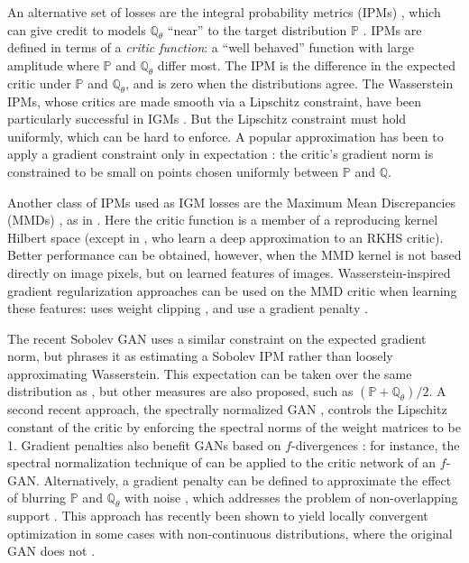 \documentclass{article}
\newcommand{\PP}{\mathbb P}
\newcommand{\QQ}{\mathbb Q}
\let\citep\parencite
\begin{document}
An alternative set of losses are the integral probability metrics (IPMs) \citep{Mueller97},
which can give credit to models $\QQ_{\theta}$  ``near'' to the target
distribution $\PP$ \parencites{wgan}{Bottou:2017}[Section 4 of][]{GneRaf07}.
IPMs are defined in terms of a {\em critic function}: a
``well behaved'' function with  large amplitude
where $\PP$ and $\QQ_\theta$ differ most.
The IPM is  the difference in the expected critic under $\PP$ and $\QQ_\theta$,
and is zero when the distributions agree.
The Wasserstein IPMs, whose critics are made smooth via a Lipschitz constraint,
have been particularly successful in IGMs \citep{wgan,wgan-gp,sinkhorn-igm}.
But the Lipschitz constraint must hold uniformly, which can be hard
to enforce. A popular approximation has been to apply a gradient constraint
only in expectation \citep{wgan-gp}:
the critic's gradient norm is constrained to be small
on points chosen uniformly between $\PP$ and $\QQ$.

Another class of IPMs used as IGM losses
are the Maximum Mean Discrepancies (MMDs) \citep{mmd-jmlr}, as in \citep{gmmn,gen-mmd}. Here the critic
function is a member of a reproducing kernel Hilbert space
(except in \cite{coulomb-gan}, who learn a deep approximation to an RKHS critic).
Better performance can be obtained, however, when the MMD kernel is not based
directly on image pixels, but on learned features
of images. Wasserstein-inspired gradient regularization
approaches can be used on the MMD critic when learning these features:
\citep{mmd-gan} uses weight clipping \citep{wgan}, and \citep{Binkowski:2018,cramer-gan}
use a gradient penalty \citep{wgan-gp}.

The recent Sobolev GAN \citep{sobolev-gan}
uses a similar constraint on the expected gradient norm,
but phrases it as estimating a Sobolev IPM rather than loosely approximating Wasserstein.
This expectation can be taken over the same distribution as \citep{wgan-gp},
but other measures are also proposed,
such as $\left(\PP+\QQ_{\theta}\right)/2$.
A second recent approach, the spectrally normalized GAN \citep{Miyato:2018},
controls the Lipschitz constant of the critic by enforcing the spectral norms of the weight matrices to be 1.
Gradient penalties also benefit GANs based on $f$-divergences \citep{NowBotRyo16}:
for instance, the spectral normalization technique of \citep{Miyato:2018} can be applied to the critic network of an $f$-GAN.
Alternatively, a gradient penalty can be defined to approximate the
effect of blurring $\PP$ and $\QQ_\theta$ with noise \citep{roth:regularization}, which
addresses the problem of non-overlapping support \parencite{towards-principled-gans}.
This approach has recently been shown to yield locally convergent optimization
in some cases with non-continuous distributions,
where the original GAN does not \parencite{Mescheder:2018}.
\end{document}
